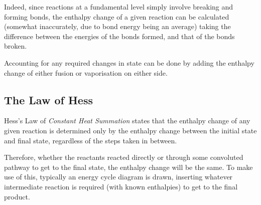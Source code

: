 
			Indeed, since reactions at a fundamental level simply involve breaking and forming bonds, the enthalpy change of a given reaction
			can be calculated (somewhat inaccurately, due to bond energy being an average) taking the difference between the energies of the
			bonds formed, and that of the bonds broken.


			Accounting for any required changes in state can be done by adding the enthalpy change of either fusion or vaporisation on either
			side.







		\pagebreak
		\subsection{The Law of Hess}

			Hess's Law of \textit{Constant Heat Summation} states that the enthalpy change of any given reaction is determined only by the
			enthalpy change between the initial state and final state, regardless of the steps taken in between.

			Therefore, whether the reactants reacted directly or through some convoluted pathway to get to the final state, the enthalpy
			change will be the same. To make use of this, typically an energy cycle diagram is drawn, inserting whatever intermediate reaction
			is required (with known enthalpies) to get to the final product.


